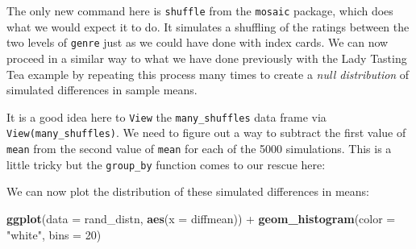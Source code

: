 \documentclass[]{tufte-book}
\newenvironment{Shaded}{\begin{snugshade}}{\end{snugshade}}
\newcommand{\KeywordTok}[1]{\textcolor[rgb]{0.13,0.29,0.53}{\textbf{{#1}}}}
\newcommand{\DataTypeTok}[1]{\textcolor[rgb]{0.13,0.29,0.53}{{#1}}}
\newcommand{\DecValTok}[1]{\textcolor[rgb]{0.00,0.00,0.81}{{#1}}}
\newcommand{\StringTok}[1]{\textcolor[rgb]{0.31,0.60,0.02}{{#1}}}
\newcommand{\NormalTok}[1]{{#1}}
\theoremstyle{definition}
\theoremstyle{definition}
\theoremstyle{remark}
\begin{document}
The only new command here is \texttt{shuffle} from the \texttt{mosaic}
package, which does what we would expect it to do. It simulates a
shuffling of the ratings between the two levels of \texttt{genre} just
as we could have done with index cards. We can now proceed in a similar
way to what we have done previously with the Lady Tasting Tea example by
repeating this process many times to create a \emph{null distribution}
of simulated differences in sample means.

\begin{Shaded}
\end{Shaded}

It is a good idea here to \texttt{View} the \texttt{many\_shuffles} data
frame via \texttt{View(many\_shuffles)}. We need to figure out a way to
subtract the first value of \texttt{mean} from the second value of
\texttt{mean} for each of the 5000 simulations. This is a little tricky
but the \texttt{group\_by} function comes to our rescue here:

\begin{Shaded}
\end{Shaded}

We can now plot the distribution of these simulated differences in
means:

\begin{Shaded}
\begin{Highlighting}[]
\KeywordTok{ggplot}\NormalTok{(}\DataTypeTok{data =} \NormalTok{rand_distn, }\KeywordTok{aes}\NormalTok{(}\DataTypeTok{x =} \NormalTok{diffmean)) +}
\StringTok{  }\KeywordTok{geom_histogram}\NormalTok{(}\DataTypeTok{color =} \StringTok{"white"}\NormalTok{, }\DataTypeTok{bins =} \DecValTok{20}\NormalTok{)}
\end{Highlighting}
\end{Shaded}
\end{document}
